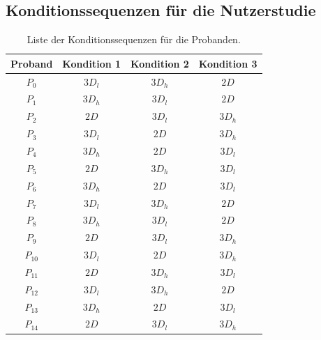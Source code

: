 \begin{appendices}
    \chapter{Konditionssequenzen für die Nutzerstudie}
    \begin{table}[h!]
        \centering
        \caption{Liste der Konditionssequenzen für die Probanden.}
        \label{appendix:condition_sequences}
        \begin{tabular}{cccc}\toprule
            Proband & Kondition 1 & Kondition 2 & Kondition 3 \\\midrule
            $P_0$ & $3D_l$ & $3D_h$ & $2D$ \\
            $P_1$ & $3D_h$ & $3D_l$ & $2D$ \\
            $P_2$ & $2D$ & $3D_l$ & $3D_h$ \\
            $P_3$ & $3D_l$ & $2D$ & $3D_h$ \\
            $P_4$ & $3D_h$ & $2D$ & $3D_l$ \\
            $P_5$ & $2D$ & $3D_h$ & $3D_l$ \\
            $P_6$ & $3D_h$ & $2D$ & $3D_l$ \\
            $P_7$ & $3D_l$ & $3D_h$ & $2D$ \\
            $P_8$ & $3D_h$ & $3D_l$ & $2D$ \\
            $P_9$ & $2D$ & $3D_l$ & $3D_h$ \\
            $P_{10}$ & $3D_l$ & $2D$ & $3D_h$ \\
            $P_{11}$ & $2D$ & $3D_h$ & $3D_l$ \\
            $P_{12}$ & $3D_l$ & $3D_h$ & $2D$ \\
            $P_{13}$ & $3D_h$ & $2D$ & $3D_l$ \\
            $P_{14}$ & $2D$ & $3D_l$ & $3D_h$ \\\bottomrule        
        \end{tabular}
    \end{table}
\end{appendices}